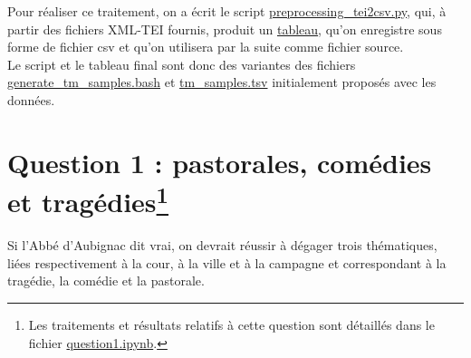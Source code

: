 \documentclass[a4paper,twoside,12pt]{article}
\begin{document}
Pour réaliser ce traitement, on a écrit le script \href{https://github.com/ragbx/enc-eval-philo-comp/blob/master/preprocessing_tei2csv.py}{preprocessing\_tei2csv.py}, qui, à partir des fichiers XML-TEI fournis, produit un \href{https://github.com/ragbx/enc-eval-philo-comp/blob/master/corpora/all_VER_NOM_ADJqua_ok.csv}{tableau}, qu'on enregistre sous forme de fichier csv et qu'on utilisera par la suite comme fichier source.\\
Le script et le tableau final sont donc des variantes des fichiers \href{https://gitlab.com/jbcamps/evaluation-philonum/-/blob/master/theatre_classique/generate_tm_samples.bash}{generate\_tm\_samples.bash} et \href{https://gitlab.com/jbcamps/evaluation-philonum/-/blob/master/theatre_classique/tm_samples.tsv}{tm\_samples.tsv} initialement proposés avec les données.

\section*{Question 1 : pastorales, comédies et tragédies\footnote{Les traitements et résultats relatifs à cette question sont détaillés dans le fichier \href{https://github.com/ragbx/enc-eval-philo-comp/blob/master/question1.ipynb}{question1.ipynb}.}}
Si l'Abbé d'Aubignac dit vrai, on devrait réussir à dégager trois thématiques, liées respectivement à la cour, à la ville et à la campagne et correspondant à la tragédie, la comédie et la pastorale.\\
\end{document}

